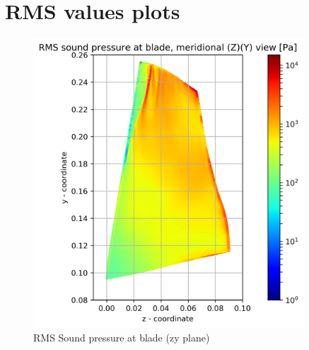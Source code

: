 
\chapter{RMS values plots} %

\label{rms_results} %

\begin{figure}[ht]
    \centering
	\includegraphics[width=0.9\textwidth]{Figures/blade-zy-rms-spl.png}
    \caption{RMS Sound pressure at blade (zy plane)} \label{blade-zy-rms-spl}
\end{figure}

